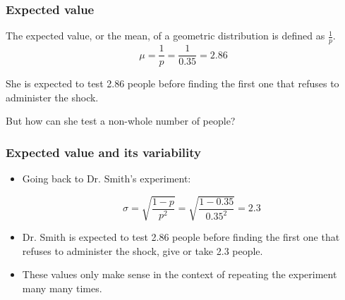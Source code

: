 \begin{frame}
\frametitle{Expected value}


\pause

The expected value, or the mean, of a geometric distribution is defined as $\frac{1}{p}$.
\[ \mu = \frac{1}{p} = \frac{1}{0.35} = 2.86 \]

\pause

She is expected to test 2.86 people before finding the first one that refuses to administer the shock. 

\pause

But how can she test a non-whole number of people?

\end{frame}


\begin{frame}
\frametitle{Expected value and its variability}


\pause

\begin{itemize}

\item Going back to Dr. Smith's experiment:

\[ \sigma = \sqrt{\frac{1-p}{p^2}} = \sqrt{\frac{1-0.35}{0.35^2}} = 2.3 \]

\pause

\item Dr. Smith is expected to test 2.86 people before finding the first one that refuses to administer the shock, give or take 2.3 people.

\pause

\item These values only make sense in the context of repeating the experiment many many times.

\end{itemize}

\end{frame}

